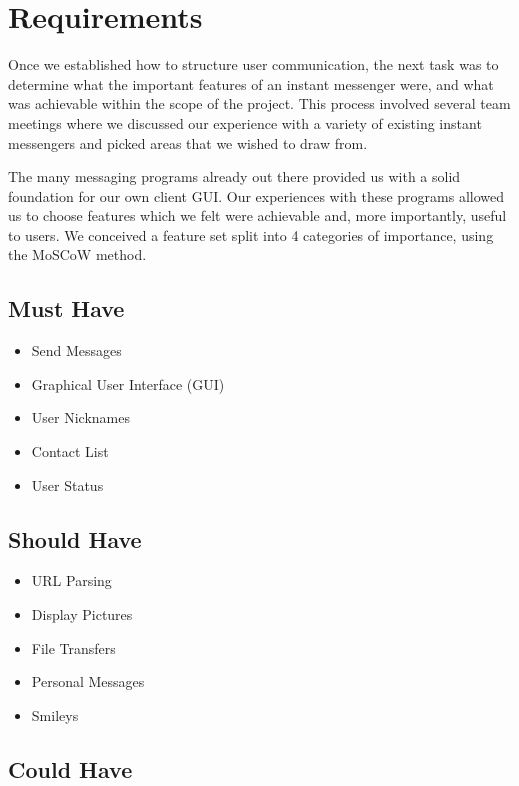 \section{Requirements}

Once we established how to structure user communication, the next task was to determine what the important features of an instant messenger were, and what was achievable within the scope of the project. This process involved several team meetings where we discussed our experience with a variety of existing instant messengers and picked areas that we wished to draw from.

The many messaging programs already out there provided us with a solid foundation for our own client GUI. Our experiences with these programs allowed us to choose features which we felt were achievable and, more importantly, useful to users. We conceived a feature set split into 4 categories of importance, using the MoSCoW method. %

\subsection{Must Have}

\begin{itemize}
\item{Send Messages}
\item{Graphical User Interface (GUI)}
\item{User Nicknames}
\item{Contact List}
\item{User Status}
\end{itemize}

\subsection{Should Have}

\begin{itemize}
\item{URL Parsing}
\item{Display Pictures}
\item{File Transfers}
\item{Personal Messages}
\item{Smileys}
\end{itemize}

\subsection{Could Have}

